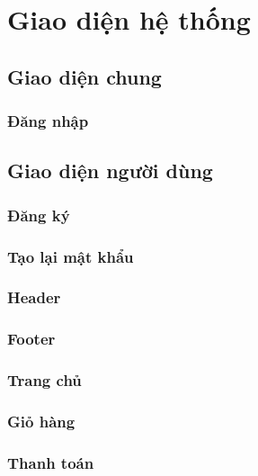 \section{Giao diện hệ thống}

\subsection{Giao diện chung}
\subsubsection{Đăng nhập}



\subsection{Giao diện người dùng}
\subsubsection{Đăng ký}



\subsubsection{Tạo lại mật khẩu}


\subsubsection{Header}


\subsubsection{Footer}



\subsubsection{Trang chủ}



\subsubsection{Giỏ hàng}


\subsubsection{Thanh toán}



